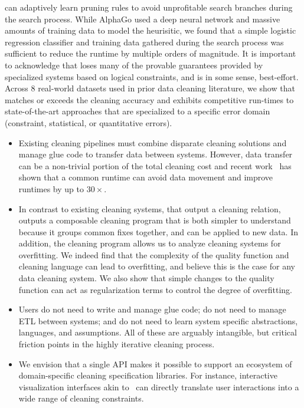 \sys can adaptively learn pruning rules to avoid unprofitable search branches during the search process.
While AlphaGo used a deep neural network and massive amounts of training data to model the heurisitic, we found that a simple logistic regression classifier and training data gathered during the search process was sufficient to reduce the runtime by multiple orders of magnitude. 
It is important to acknowledge that \sys loses many of the provable guarantees provided by specialized systems based on logical constraints, and is in some sense, best-effort.  
Across 8 real-world datasets used in prior data cleaning literature, we show that \sys matches or exceeds the cleaning accuracy and exhibits competitive run-times to state-of-the-art approaches that are specialized to a specific error domain (constraint, statistical, or quantitative errors).  

\begin{itemize}
\item {} Existing cleaning pipelines must combine disparate cleaning solutions and manage glue code to transfer data between systems.  However, data transfer can be a non-trivial portion of the total cleaning cost and recent work~\cite{palkar2017weld} has shown that a common runtime can avoid data movement and improve runtimes by up to $30\times$.  

\item {} In contrast to existing cleaning systems, that output a cleaning relation, \sys outputs a composable cleaning program that is both simpler to understand because it groups common fixes together, and can be applied to new data.  In addition, the cleaning program allows us to analyze cleaning systems for overfitting.  We indeed find that the complexity of the quality function and cleaning language can lead to overfitting, and believe this is the case for any data cleaning system.  We also show that simple changes to the quality function can act as regularization terms to control the degree of overfitting.

\item {}  Users do not need to write and manage glue code; do not need to manage ETL between systems; and do not need to learn system specific abstractions, languages, and assumptions.  All of these are arguably intangible, but critical friction points in the highly iterative cleaning process.  

\item {} We envision that a single API makes it possible to support an ecosystem of domain-specific cleaning specification libraries.  For instance,  interactive visualization interfaces akin to~\cite{trifacta,kandel2011wrangler,DBLP:journals/pvldb/0002M13,wu2012demonstration} can directly translate user interactions into a wide range of cleaning constraints.   
\end{itemize}


